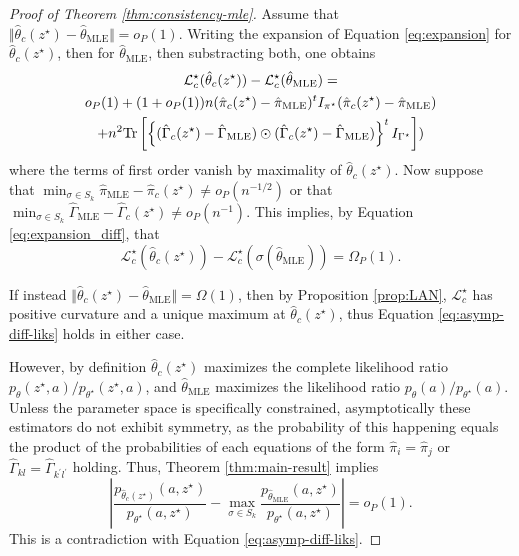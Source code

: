 \documentclass[../../main.tex]{subfiles} %
\begin{document}
\begin{proof}[Proof of Theorem \ref{thm:consistency-mle}]
	Assume that \(\Vert \hat \theta_c (z^\star) - \hat \theta_{\text{MLE}} \Vert = 
	o_P (1)\). Writing the expansion of Equation \eqref{eq:expansion} for \(\hat 
	\theta_c (z^\star)\), then for \(\hat \theta_{\text{MLE}}\), then substracting 
	both, one obtains
	\begin{multline}
		\mathcal{L}^\star_c (\hat \theta_c (z^\star)) - \mathcal{L}^\star_c (\hat 
		\theta_{\text{MLE}}) = \\
		o_P (1) + (1 + o_P (1)) 
		n (\hat \pi_c (z^\star) - \hat \pi_{\text{MLE}})^t I_{\pi^\star} (\hat 
		\pi_c 
		(z^\star) - \hat \pi_{\text{MLE}}) \\
		+ n^2 \textup{Tr} \left[ \left\{ (\hat \Gamma_c (z^\star) - \hat 
		\Gamma_{\text{MLE}}) \odot (\hat \Gamma_c (z^\star) - \hat 
		\Gamma_{\text{MLE}}) \right\}^t I_{\Gamma^\star} \right])
		\label{eq:expansion_diff}
	\end{multline}
	where the terms of first order vanish by maximality of \(\hat \theta_c 
	(z^\star)\). Now suppose that \(\min_{\sigma \in S_k} \hat \pi_{\text{MLE}} - 
	\hat \pi_c (z^\star) \neq o_P (n^{-1/2})\) or that \(\min_{\sigma \in S_k} 
	\hat \Gamma_{\text{MLE}} - \hat \Gamma_c (z^\star) \neq o_P (n^{-1})\). 
	This implies, by Equation \eqref{eq:expansion_diff}, that
	\begin{equation}
		\mathcal{L}^\star_c (\hat \theta_c (z^\star)) - \mathcal{L}^\star_c 
		(\sigma(\hat 
		\theta_{\text{MLE}})) = \Omega_P (1).
		\label{eq:asymp-diff-liks}
	\end{equation}
	
	If instead \(\Vert \hat \theta_c (z^\star) - \hat \theta_{\text{MLE}}\Vert = 
	\Omega(1)\), then by Proposition \ref{prop:LAN}, \(\mathcal L^\star_c\) has 
	positive curvature and a unique maximum at \(\hat \theta_c (z^\star)\), thus 
	Equation \eqref{eq:asymp-diff-liks} holds in either case.
	
	However, by definition \(\hat \theta_c (z^\star)\) maximizes the complete 
	likelihood ratio \(p_{\theta} (z^\star, a)/p_{\theta^\star} (z^\star, a)\), 
	and \(\hat \theta_{\text{MLE}}\) maximizes the likelihood ratio 
	\(p_{\theta} (a)/p_{\theta^\star} (a)\). Unless the parameter space is 
	specifically constrained, asymptotically these estimators do not exhibit 
	symmetry, as the probability of this happening equals the product of the 
	probabilities of each equations of the form \(\hat \pi_i = \hat \pi_j\) or 
	\(\hat \Gamma_{kl} = \hat \Gamma_{k^\prime l^\prime}\) holding. Thus, 
	Theorem \ref{thm:main-result} implies
	\begin{equation}
		\left| \frac{p_{\hat \theta_c (z^\star)}(a, z^\star)}{p_{\theta^\star} (a, 
			z^\star)} - \max_{\sigma \in S_k} \frac{p_{\hat \theta_{\text{MLE}}}(a, 
			z^\star)}{p_{\theta^\star} (a, z^\star)} \right| = o_P (1).
	\end{equation}
	This is a contradiction with Equation \eqref{eq:asymp-diff-liks}. 
\end{proof}
\end{document}

